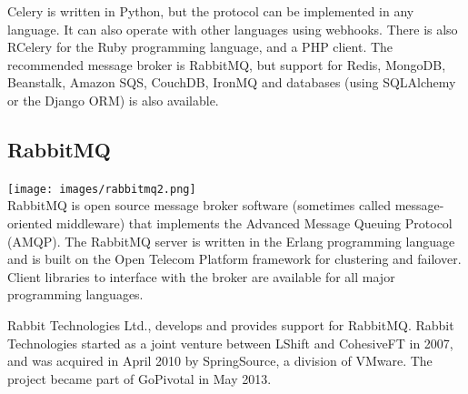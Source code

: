 \documentclass[12pt]{article}
\begin{document}
Celery is written in Python, but the protocol can be implemented in any language. It can also operate with other languages using webhooks. There is also RCelery for the Ruby programming language, and a PHP client.
The recommended message broker is RabbitMQ, but support for Redis, MongoDB, Beanstalk, Amazon SQS, CouchDB, IronMQ and databases (using SQLAlchemy or the Django ORM) is also available.~\cite{wiki:celery}

\subsection{RabbitMQ}

\texttt{[image: images/rabbitmq2.png]} \\

RabbitMQ is open source message broker software (sometimes called message-oriented middleware) that implements the Advanced Message Queuing Protocol (AMQP). The RabbitMQ server is written in the Erlang programming language and is built on the Open Telecom Platform framework for clustering and failover. Client libraries to interface with the broker are available for all major programming languages.

Rabbit Technologies Ltd., develops and provides support for RabbitMQ. Rabbit Technologies started as a joint venture between LShift and CohesiveFT in 2007, and was acquired in April 2010 by SpringSource, a division of VMware. The project became part of GoPivotal in May 2013.
\end{document}

